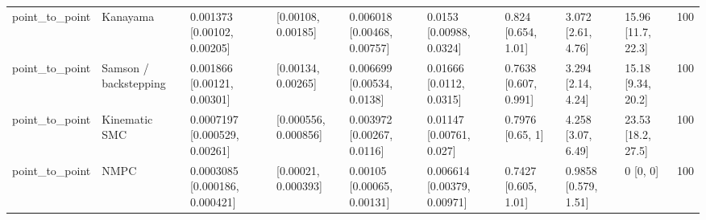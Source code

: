 \begin{table}
\begin{tabular}{llllllllll}
point\_to\_point & Kanayama & 0.001373 [0.00102, 0.00205] & [0.00108, 0.00185] & 0.006018 [0.00468, 0.00757] & 0.0153 [0.00988, 0.0324] & 0.824 [0.654, 1.01] & 3.072 [2.61, 4.76] & 15.96 [11.7, 22.3] & 100 \\
point\_to\_point & Samson / backstepping & 0.001866 [0.00121, 0.00301] & [0.00134, 0.00265] & 0.006699 [0.00534, 0.0138] & 0.01666 [0.0112, 0.0315] & 0.7638 [0.607, 0.991] & 3.294 [2.14, 4.24] & 15.18 [9.34, 20.2] & 100 \\
point\_to\_point & Kinematic SMC & 0.0007197 [0.000529, 0.00261] & [0.000556, 0.000856] & 0.003972 [0.00267, 0.0116] & 0.01147 [0.00761, 0.027] & 0.7976 [0.65, 1] & 4.258 [3.07, 6.49] & 23.53 [18.2, 27.5] & 100 \\
point\_to\_point & NMPC & 0.0003085 [0.000186, 0.000421] & [0.00021, 0.000393] & 0.00105 [0.00065, 0.00131] & 0.006614 [0.00379, 0.00971] & 0.7427 [0.605, 1.01] & 0.9858 [0.579, 1.51] & 0 [0, 0] & 100 \\
\bottomrule
\end{tabular}
\end{table}
